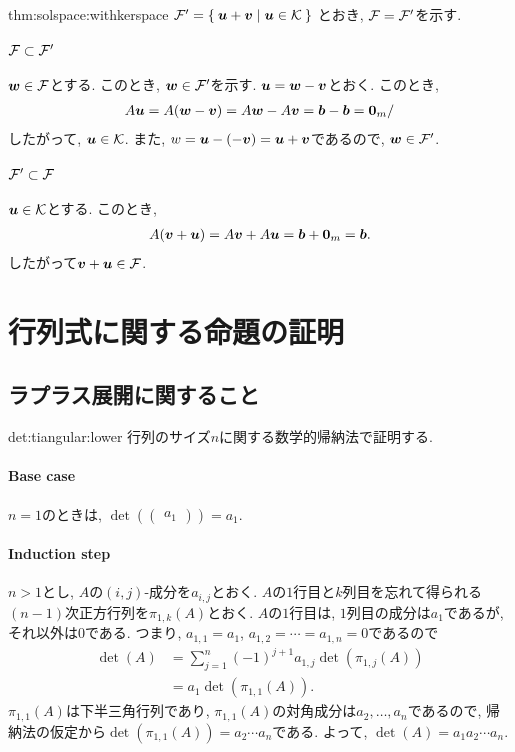 \begin{proofof}{thm:solspace:withkerspace}
$\mathcal{F}'=\Set{\boldsymbol{u}+\boldsymbol{v}|\boldsymbol{u}\in\mathcal{K}}$
  とおき,
  $\mathcal{F}=\mathcal{F}'$を示す.
  \paragraph{$\mathcal{F}\subset\mathcal{F}'$}
  $\boldsymbol{w}\in \mathcal{F}$とする.
  このとき,   $\boldsymbol{w}\in\mathcal{F}'$を示す.
  $\boldsymbol{u}=\boldsymbol{w}-\boldsymbol{v}$とおく.
  このとき,
  \begin{align*}
    A\boldsymbol{u}=A(\boldsymbol{w}-\boldsymbol{v})=A\boldsymbol{w}-A\boldsymbol{v}=\boldsymbol{b}-\boldsymbol{b}=\boldsymbol{0}_m/
  \end{align*}
  したがって, $\boldsymbol{u}\in\mathcal{K}$.
  また, $w=\boldsymbol{u}-(-\boldsymbol{v})=\boldsymbol{u}+\boldsymbol{v}$であるので,
  $\boldsymbol{w}\in\mathcal{F}'$.

  \paragraph{$\mathcal{F}'\subset\mathcal{F}$}
  $\boldsymbol{u}\in\mathcal{K}$とする.
  このとき,
  \begin{align*}
    A(\boldsymbol{v}+\boldsymbol{u})=A\boldsymbol{v}+A\boldsymbol{u}=\boldsymbol{b}+\boldsymbol{0}_m=\boldsymbol{b}.
  \end{align*}
  したがって$\boldsymbol{v}+\boldsymbol{u}\in\mathcal{F}$.
\end{proofof}


\section{行列式に関する命題の証明}
\subsection{ラプラス展開に関すること}
\begin{proofof}{det:tiangular:lower}
  行列のサイズ$n$に関する数学的帰納法で証明する.
  \paragraph{Base case}
  $n=1$のときは,
  $\det(\begin{pmatrix}a_1\end{pmatrix})=a_1$.
    \paragraph{Induction step}
    $n>1$とし, $A$の$(i,j)$-成分を$a_{i,j}$とおく.
    $A$の$1$行目と$k$列目を忘れて得られる$(n-1)$次正方行列を$\pi_{1,k}(A)$とおく.
    $A$の$1$行目は, $1$列目の成分は$a_1$であるが, それ以外は$0$である.
    つまり,
    $a_{1,1}=a_1$,  $a_{1,2}=\cdots=a_{1,n}=0$であるので
    \begin{align*}
      \det(A)&=\sum_{j=1}^{n}
      (-1)^{j+1}a_{1,j}\det(\pi_{1,j}(A))\\
      &=a_{1}\det(\pi_{1,1}(A)).
    \end{align*}
    $\pi_{1,1}(A)$は下半三角行列であり,
    $\pi_{1,1}(A)$の対角成分は$a_2,\ldots,a_n$であるので,
    帰納法の仮定から$\det(\pi_{1,1}(A))=a_2\cdots a_n$である.
    よって, $\det(A)=a_1a_2\cdots a_n$.    
\end{proofof}


